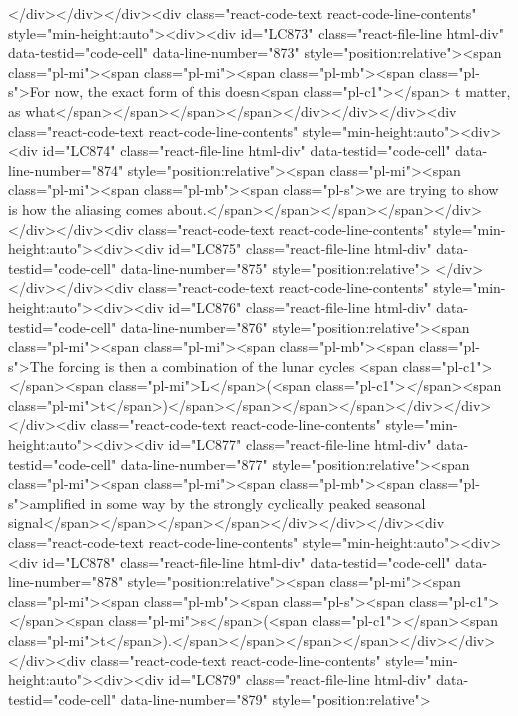 {{{{{{{{{</div></div></div><div class="react-code-text react-code-line-contents" style="min-height:auto"><div><div id="LC873" class="react-file-line html-div" data-testid="code-cell" data-line-number="873" style="position:relative"><span class="pl-mi"><span class="pl-mi"><span class="pl-mb"><span class="pl-s">For now, the exact form of this doesn<span class="pl-c1">\textquotesingle</span> t matter, as what</span></span></span></span></div></div></div><div class="react-code-text react-code-line-contents" style="min-height:auto"><div><div id="LC874" class="react-file-line html-div" data-testid="code-cell" data-line-number="874" style="position:relative"><span class="pl-mi"><span class="pl-mi"><span class="pl-mb"><span class="pl-s">we are trying to show is how the aliasing comes about.</span></span></span></span></div></div></div><div class="react-code-text react-code-line-contents" style="min-height:auto"><div><div id="LC875" class="react-file-line html-div" data-testid="code-cell" data-line-number="875" style="position:relative">
</div></div></div><div class="react-code-text react-code-line-contents" style="min-height:auto"><div><div id="LC876" class="react-file-line html-div" data-testid="code-cell" data-line-number="876" style="position:relative"><span class="pl-mi"><span class="pl-mi"><span class="pl-mb"><span class="pl-s">The forcing is then a combination of the lunar cycles <span class="pl-c1">\emph</span>{<span class="pl-mi">L</span>}(<span class="pl-c1">\emph</span>{<span class="pl-mi">t</span>})</span></span></span></span></div></div></div><div class="react-code-text react-code-line-contents" style="min-height:auto"><div><div id="LC877" class="react-file-line html-div" data-testid="code-cell" data-line-number="877" style="position:relative"><span class="pl-mi"><span class="pl-mi"><span class="pl-mb"><span class="pl-s">amplified in some way by the strongly cyclically peaked seasonal signal</span></span></span></span></div></div></div><div class="react-code-text react-code-line-contents" style="min-height:auto"><div><div id="LC878" class="react-file-line html-div" data-testid="code-cell" data-line-number="878" style="position:relative"><span class="pl-mi"><span class="pl-mi"><span class="pl-mb"><span class="pl-s"><span class="pl-c1">\emph</span>{<span class="pl-mi">s</span>}(<span class="pl-c1">\emph</span>{<span class="pl-mi">t</span>}).</span></span></span></span></div></div></div><div class="react-code-text react-code-line-contents" style="min-height:auto"><div><div id="LC879" class="react-file-line html-div" data-testid="code-cell" data-line-number="879" style="position:relative">
}}}}}}}}}
